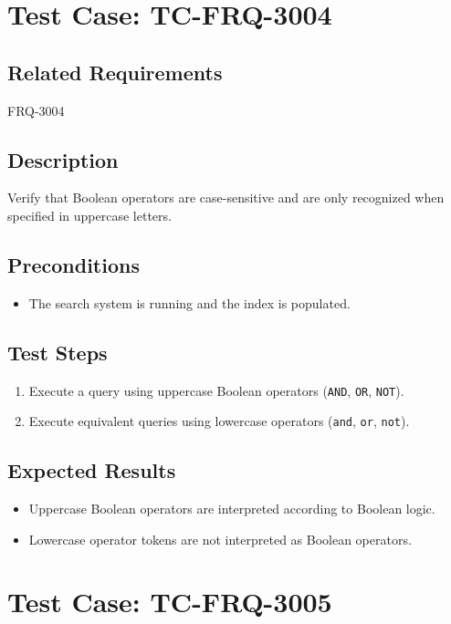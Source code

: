 \documentclass{article}
\begin{document}
\section{Test Case: TC-FRQ-3004}

\subsection*{Related Requirements}
FRQ-3004

\subsection*{Description}
Verify that Boolean operators are case-sensitive and are only recognized when specified in uppercase letters.

\subsection*{Preconditions}
\begin{itemize}
    \item The search system is running and the index is populated.
\end{itemize}

\subsection*{Test Steps}
\begin{enumerate}
    \item Execute a query using uppercase Boolean operators (\texttt{AND}, \texttt{OR}, \texttt{NOT}).
    \item Execute equivalent queries using lowercase operators (\texttt{and}, \texttt{or}, \texttt{not}).
\end{enumerate}

\subsection*{Expected Results}
\begin{itemize}
    \item Uppercase Boolean operators are interpreted according to Boolean logic.
    \item Lowercase operator tokens are not interpreted as Boolean operators.
\end{itemize}

\section{Test Case: TC-FRQ-3005}
\end{document}
